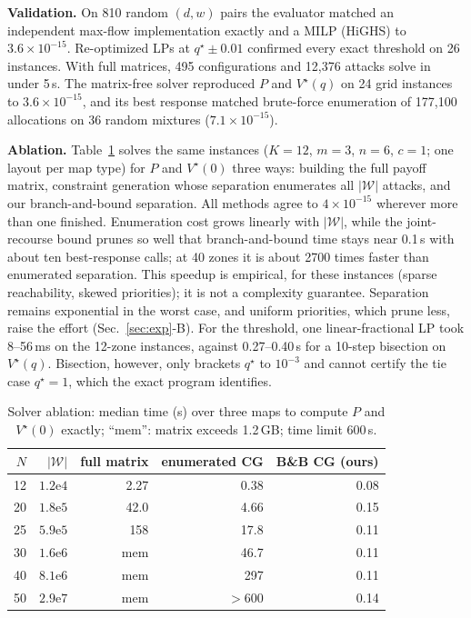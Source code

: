 \documentclass[letterpaper,journal]{IEEEtran}
\theoremstyle{remark}
\newcommand{\W}{\mathcal{W}}
\begin{document}
\textbf{Validation.} On 810 random $(d,w)$ pairs the evaluator matched an independent max-flow implementation exactly and a MILP (HiGHS) to $3.6\times10^{-15}$. Re-optimized LPs at $q^\star\pm0.01$ confirmed every exact threshold on 26 instances. With full matrices, 495 configurations and 12{,}376 attacks solve in under 5\,s. The matrix-free solver reproduced $P$ and $V^\star(q)$ on 24 grid instances to $3.6\times10^{-15}$, and its best response matched brute-force enumeration of 177{,}100 allocations on 36 random mixtures ($7.1\times10^{-15}$).

\textbf{Ablation.} Table~\ref{tab:abl} solves the same instances ($K=12$, $m=3$, $n=6$, $c=1$; one layout per map type) for $P$ and $V^\star(0)$ three ways: building the full payoff matrix, constraint generation whose separation enumerates all $|\W|$ attacks, and our branch-and-bound separation. All methods agree to $4\times10^{-15}$ wherever more than one finished. Enumeration cost grows linearly with $|\W|$, while the joint-recourse bound prunes so well that branch-and-bound time stays near 0.1\,s with about ten best-response calls; at 40 zones it is about 2700 times faster than enumerated separation. This speedup is empirical, for these instances (sparse reachability, skewed priorities); it is not a complexity guarantee. Separation remains exponential in the worst case, and uniform priorities, which prune less, raise the effort (Sec.~\ref{sec:exp}-B). For the threshold, one linear-fractional LP took 8--56\,ms on the 12-zone instances, against 0.27--0.40\,s for a 10-step bisection on $V^\star(q)$. Bisection, however, only brackets $q^\star$ to $10^{-3}$ and cannot certify the tie case $q^\star=1$, which the exact program identifies.

\begin{table}[t]
\centering
\caption{Solver ablation: median time (s) over three maps to compute $P$ and $V^\star(0)$ exactly; ``mem'': matrix exceeds 1.2\,GB; time limit 600\,s.}
\label{tab:abl}
\footnotesize\setlength{\tabcolsep}{4pt}
\begin{tabular}{@{}rrrrr@{}}
\toprule
$N$ & $|\W|$ & full matrix & enumerated CG & B\&B CG (ours)\\
\midrule
12 & $1.2\mathrm{e}4$ & 2.27 & 0.38 & 0.08\\
20 & $1.8\mathrm{e}5$ & 42.0 & 4.66 & 0.15\\
25 & $5.9\mathrm{e}5$ & 158 & 17.8 & 0.11\\
30 & $1.6\mathrm{e}6$ & mem & 46.7 & 0.11\\
40 & $8.1\mathrm{e}6$ & mem & 297 & 0.11\\
50 & $2.9\mathrm{e}7$ & mem & $>600$ & 0.14\\
\bottomrule
\end{tabular}
\end{table}
\end{document}
